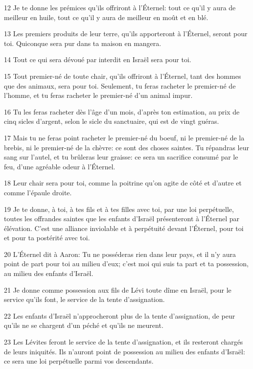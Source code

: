 \par 12 Je te donne les prémices qu'ils offriront à l'Éternel: tout ce qu'il y aura de meilleur en huile, tout ce qu'il y aura de meilleur en moût et en blé.
\par 13 Les premiers produits de leur terre, qu'ils apporteront à l'Éternel, seront pour toi. Quiconque sera pur dans ta maison en mangera.
\par 14 Tout ce qui sera dévoué par interdit en Israël sera pour toi.
\par 15 Tout premier-né de toute chair, qu'ils offriront à l'Éternel, tant des hommes que des animaux, sera pour toi. Seulement, tu feras racheter le premier-né de l'homme, et tu feras racheter le premier-né d'un animal impur.
\par 16 Tu les feras racheter dès l'âge d'un mois, d'après ton estimation, au prix de cinq sicles d'argent, selon le sicle du sanctuaire, qui est de vingt guéras.
\par 17 Mais tu ne feras point racheter le premier-né du boeuf, ni le premier-né de la brebis, ni le premier-né de la chèvre: ce sont des choses saintes. Tu répandras leur sang sur l'autel, et tu brûleras leur graisse: ce sera un sacrifice consumé par le feu, d'une agréable odeur à l'Éternel.
\par 18 Leur chair sera pour toi, comme la poitrine qu'on agite de côté et d'autre et comme l'épaule droite.
\par 19 Je te donne, à toi, à tes fils et à tes filles avec toi, par une loi perpétuelle, toutes les offrandes saintes que les enfants d'Israël présenteront à l'Éternel par élévation. C'est une alliance inviolable et à perpétuité devant l'Éternel, pour toi et pour ta postérité avec toi.
\par 20 L'Éternel dit à Aaron: Tu ne posséderas rien dans leur pays, et il n'y aura point de part pour toi au milieu d'eux; c'est moi qui suis ta part et ta possession, au milieu des enfants d'Israël.
\par 21 Je donne comme possession aux fils de Lévi toute dîme en Israël, pour le service qu'ils font, le service de la tente d'assignation.
\par 22 Les enfants d'Israël n'approcheront plus de la tente d'assignation, de peur qu'ils ne se chargent d'un péché et qu'ils ne meurent.
\par 23 Les Lévites feront le service de la tente d'assignation, et ils resteront chargés de leurs iniquités. Ils n'auront point de possession au milieu des enfants d'Israël: ce sera une loi perpétuelle parmi vos descendants.
